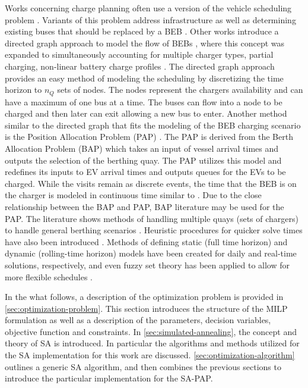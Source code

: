 \documentclass[11pt,a4paper,final]{article}
\begin{document}
Works concerning charge planning often use a version of the vehicle scheduling problem \cite{tang-2019-robus-sched,li-2014-trans-bus,he-2020-optim-charg}. Variants of this problem address infrastructure as well as determining
existing buses that should be replaced by a BEB \cite{zhou-2020-bi-objec,duan-2021-refor-mixed,rinaldi-2020-mixed-fleet,zhou-2020-collab-optim}. Other works introduce a directed graph approach to model the flow
of BEBs \cite{whitaker-2023-a-network,liu-2020-batter-elect}, where this concept was expanded to simultaneously
accounting for multiple charger types, partial charging, non-linear battery charge profiles
\cite{whitaker-2023-a-network}. The directed graph approach provides an easy method of modeling the scheduling by
discretizing the time horizon to \(n_Q\) sets of nodes. The nodes represent the chargers availability and can have a
maximum of one bus at a time. The buses can flow into a node to be charged and then later can exit allowing a new bus to
enter. Another method similar to the directed graph that fits the modeling of the BEB charging scenario is the Position
Allocation Problem (PAP) \cite{qarebagh-2019-optim-sched}. The PAP is derived from the Berth Allocation Problem (BAP)
which takes an input of vessel arrival times and outputs the selection of the berthing quay. The PAP utilizes this model
and redefines its inputs to EV arrival times and outputs queues for the EVs to be charged. While the visits remain as
discrete events, the time that the BEB is on the charger is modeled in continuous time similar to
\cite{frojan-2015-contin-berth,qarebagh-2019-optim-sched,zhou-2020-collab-optim}. Due to the close relationship
between the BAP and PAP, BAP literature may be used for the PAP. The literature shows methods of handling multiple quays
(sets of chargers) to handle general berthing scenarios \cite{frojan-2015-contin-berth,dai-2008-suppl-chain-analy}.
Heuristic procedures for quicker solve times have also been introduced \cite{imai-2001-dynam-berth}. Methods of
defining static (full time horizon) and dynamic (rolling-time horizon) models have been created for daily and real-time
solutions, respectively, and even fuzzy set theory has been applied to allow for more flexible schedules
\cite{bello-2019-fuzzy-activ}.

In the what follows, a description of the optimization problem is provided in \ref{sec:optimization-problem}. This section
introduces the structure of the MILP formulation as well as a description of the parameters, decision variables,
objective function and constraints. In \ref{sec:simulated-annealing}, the concept and theory of SA is introduced. In
particular the algorithms and methods utilized for the SA implementation for this work are discussed.
\ref{sec:optimization-algorithm} outlines a generic SA algorithm, and then combines the previous sections to introduce the
particular implementation for the SA-PAP.
\end{document}
